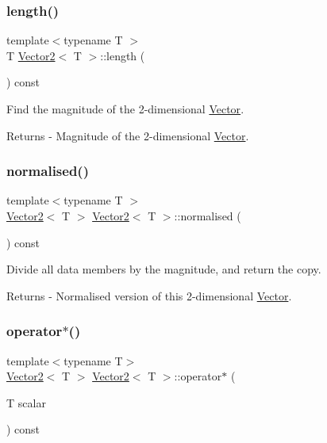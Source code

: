 \subsubsection{\texorpdfstring{length()}{length()}}
{\footnotesize\ttfamily template$<$typename T $>$ \\
T \mbox{\hyperlink{class_vector2}{Vector2}}$<$ T $>$\+::length (\begin{DoxyParamCaption}{ }\end{DoxyParamCaption}) const}

Find the magnitude of the 2-\/dimensional \mbox{\hyperlink{class_vector}{Vector}}. \begin{DoxyReturn}{Returns}
-\/ Magnitude of the 2-\/dimensional \mbox{\hyperlink{class_vector}{Vector}}. 
\end{DoxyReturn}
\mbox{\label{class_vector2_aa21618ee0b6e9684da1a5b2d7c8ad3d4}} 
\subsubsection{\texorpdfstring{normalised()}{normalised()}}
{\footnotesize\ttfamily template$<$typename T $>$ \\
\mbox{\hyperlink{class_vector2}{Vector2}}$<$ T $>$ \mbox{\hyperlink{class_vector2}{Vector2}}$<$ T $>$\+::normalised (\begin{DoxyParamCaption}{ }\end{DoxyParamCaption}) const}

Divide all data members by the magnitude, and return the copy. \begin{DoxyReturn}{Returns}
-\/ Normalised version of this 2-\/dimensional \mbox{\hyperlink{class_vector}{Vector}}. 
\end{DoxyReturn}
\mbox{\label{class_vector2_a6b89b2f334240f06480bc55fce6c2a5a}} 
\subsubsection{\texorpdfstring{operator$\ast$()}{operator*()}}
{\footnotesize\ttfamily template$<$typename T$>$ \\
\mbox{\hyperlink{class_vector2}{Vector2}}$<$ T $>$ \mbox{\hyperlink{class_vector2}{Vector2}}$<$ T $>$\+::operator$\ast$ (\begin{DoxyParamCaption}\item[{T}]{scalar }\end{DoxyParamCaption}) const}

